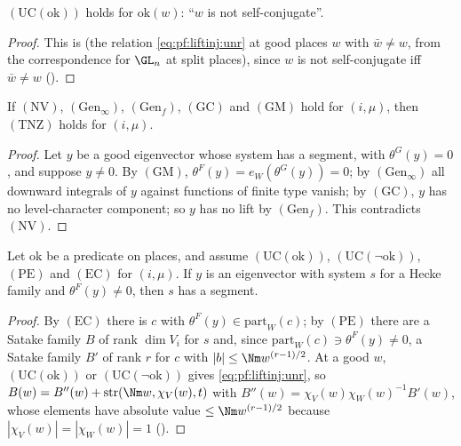 \begin{lemma}\label{pf:stageU:unrsplit}
$(\mathrm{UC}(\mathrm{ok}))$ holds for $\mathrm{ok}(w)$: ``$w$ is not self-conjugate''.
\end{lemma}

\begin{proof}
This is  (the relation \eqref{eq:pf:liftinj:unr} at good places $w$ with $\bar w\ne w$,
from the correspondence for $\GL_n$ at split places), since $w$ is not self-conjugate iff $\bar w\ne w$
().
\end{proof}

\begin{lemma}\label{pf:stageU:typenz}
If $(\mathrm{NV})$, $(\mathrm{Gen}_\infty)$, $(\mathrm{Gen}_f)$, $(\mathrm{GC})$ and $(\mathrm{GM})$ hold for $(i,\mu)$, then $(\mathrm{TNZ})$ holds for
$(i,\mu)$.
\end{lemma}

\begin{proof}
Let $y$ be a good eigenvector whose system has a segment, with $\theta^G(y)=0$, and suppose $y\ne0$. By $(\mathrm{GM})$,
$\theta^F(y)=e_W(\theta^G(y))=0$; by $(\mathrm{Gen}_\infty)$ all downward integrals of $y$ against functions of finite type vanish; by
$(\mathrm{GC})$, $y$ has no level-character component; so $y$ has no lift by $(\mathrm{Gen}_f)$. This contradicts $(\mathrm{NV})$.
\end{proof}

\begin{lemma}\label{pf:stageU:hasstring}
Let $\mathrm{ok}$ be a predicate on places, and assume $(\mathrm{UC}(\mathrm{ok}))$, $(\mathrm{UC}(\neg\mathrm{ok}))$, $(\mathrm{PE})$ and $(\mathrm{EC})$ for
$(i,\mu)$. If $y$ is an eigenvector with system $s$ for a Hecke family and $\theta^F(y)\ne0$, then $s$ has a segment.
\end{lemma}

\begin{proof}
By $(\mathrm{EC})$ there is $c$ with $\theta^F(y)\in\mathrm{part}_W(c)$; by $(\mathrm{PE})$ there are a Satake family $B$ of rank $\dim V_i$ for
$s$ and, since $\mathrm{part}_W(c)\ni\theta^F(y)\ne0$, a Satake family $B'$ of rank $r$ for $c$ with $|b|\le\Nm w^{(r-1)/2}$. At a good $w$,
$(\mathrm{UC}(\mathrm{ok}))$ or $(\mathrm{UC}(\neg\mathrm{ok}))$ gives \eqref{eq:pf:liftinj:unr}, so $B(w)=B''(w)+\mathrm{str}(\Nm w,\chi_V(w),t)$
with $B''(w)=\chi_V(w)\chi_W(w)^{-1}B'(w)$, whose elements have absolute value $\le\Nm w^{(r-1)/2}$ because
$|\chi_V(w)|=|\chi_W(w)|=1$ ().
\end{proof}

